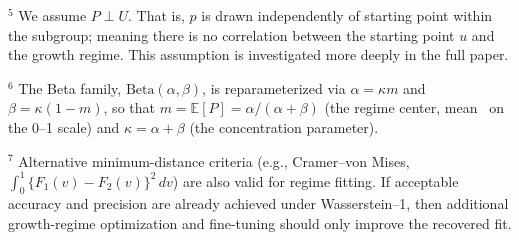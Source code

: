 \documentclass[10pt]{article}
\begin{document}
\begin{minipage}[t]{7.55in}
{\vspace{4pt}
$^{5}$ We assume $P\perp U$. That is, $p$ is drawn independently of starting
point within the subgroup; meaning there is no correlation between the starting point $u$ and
the growth regime. This assumption is investigated more deeply in the full paper.

\vspace{4pt}
$^{6}$ The Beta family, $\mathrm{Beta}(\alpha, \beta)$, is reparameterized via
$\alpha = \kappa m$ and $\beta = \kappa(1-m)$, so that $m = \mathbb{E}[P] = \alpha / (\alpha + \beta)$
(the regime center, mean \SGPc~on the 0--1 scale) and $\kappa = \alpha + \beta$
(the concentration parameter).

\vspace{4pt}
$^{7}$ Alternative minimum-distance criteria (e.g., Cramer--von Mises,
$\int_0^1 \{F_1(v)-F_2(v)\}^2\,dv$) are also valid for regime fitting. If acceptable
accuracy and precision are already achieved under Wasserstein--1, then additional
growth-regime optimization and fine-tuning should only improve the recovered fit.}
\end{minipage}
\end{document}
